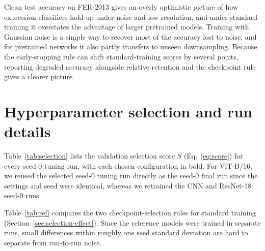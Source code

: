 \documentclass{article}
\begin{document}
Clean test accuracy on FER-2013 gives an overly optimistic picture of how expression classifiers hold up under noise and
low resolution, and under standard training it overstates the advantage of larger pretrained models. Training with
Gaussian noise is a simple way to recover most of the accuracy lost to noise, and for pretrained networks it also partly
transfers to unseen downsampling. Because the early-stopping rule can shift standard-training scores by several points,
reporting degraded accuracy alongside relative retention and the checkpoint rule gives a clearer picture.

{\small


}

\appendix
\raggedbottom

\section{Hyperparameter selection and run details}
\label{app:selection}

Table~\ref{tab:selection} lists the validation selection score $S$ (Eq.~\ref{eq:score}) for every seed-0 tuning run,
with each chosen configuration in bold. For ViT-B/16, we reused the selected seed-0 tuning run directly as the seed-0 final run since the settings and seed were
identical, whereas we retrained the CNN and ResNet-18 seed-0 runs.

\begin{table}[H]
  \caption{Validation selection scores $S$ across tuning grids. Left: learning-rate search under standard training.
  Right: noise-augmentation search at the selected learning rate.}
  \label{tab:selection}
  \centering
  \small
  
\end{table}

Table~\ref{tab:ref} compares the two checkpoint-selection rules for standard training
(Section~\ref{sec:selection-effect}). Since the reference models were trained in separate runs, small differences within roughly one seed standard deviation
are hard to separate from run-to-run noise.

\begin{table}[H]
  \caption{Standard training with checkpoints chosen by score $S$ versus original validation
  accuracy alone. Test accuracy (\%), mean $\pm$ sample standard deviation over three seeds; difference rows are
  paired by seed (mean $\pm$ standard deviation of the three differences).}
  \label{tab:ref}
  \centering
  \small
  
\end{table}
\end{document}
